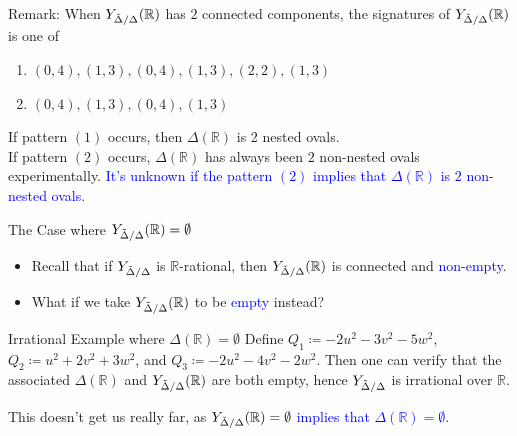 \documentclass[hyperref, notheorems]{beamer}
\newcommand{\Rbb}{\mathbb{R}}
\newcommand{\txtblue}{\textcolor{blue}}
\newcommand{\Ydd}{Y_{\Tilde{\Delta} /\Delta}}
\theoremstyle{definition}
\begin{document}
\begin{frame}
\begin{block}{Remark:}
    When $\Ydd(\Rbb)$ has $2$ connected components, the signatures of $\Ydd(\Rbb)$ is one of
    \begin{enumerate}
        \item $(0, 4), (1, 3), (0, 4), (1, 3), (2, 2), (1, 3)$
        \item $(0, 4), (1, 3), (0, 4), (1, 3)$
    \end{enumerate}
\vspace{\baselineskip}
    If pattern $(1)$ occurs, then $\Delta(\Rbb)$ is 2 nested ovals.\\
\vspace{\baselineskip}
If pattern $(2)$ occurs, $\Delta(\Rbb)$ has always been $2$ non-nested ovals experimentally. \txtblue{It's unknown if the pattern $(2)$ implies that $\Delta(\Rbb)$ is $2$ non-nested ovals}.
\end{block}
\end{frame}

\begin{frame}{The Case where $\Ydd(\Rbb) = \emptyset$}
\begin{itemize}
    \item Recall that if $\Ydd$ is $\Rbb$-rational, then $\Ydd(\Rbb)$ is connected and \txtblue{non-empty}.
    \item What if we take $\Ydd(\Rbb)$ to be \txtblue{empty} instead?
\end{itemize}

\begin{block}{Irrational Example where $\Delta(\Rbb) = \emptyset$}
    Define $Q_1 \coloneqq  -2u^2 - 3v^2 - 5w^2$, $Q_2 \coloneqq u^2 + 2v^2 + 3w^2$, and $Q_3 \coloneqq -2u^2 - 4v^2 - 2w^2$. Then one can verify that the associated $\Delta(\Rbb)$ and $\Ydd(\Rbb)$ are both empty, hence $\Ydd$ is irrational over $\Rbb$.
\end{block}
    This doesn't get us really far, as \txtblue{$\Ydd(\Rbb) = \emptyset$ implies that $\Delta(\Rbb) = \emptyset$}.
\end{frame}
\end{document}
